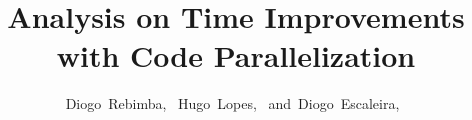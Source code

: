\documentclass[10pt,journal,compsoc]{IEEEtran}
\begin{document}
%
\title{Analysis on Time Improvements with Code Parallelization}
%
%
%
%

\author{Diogo~Rebimba,~
        Hugo~Lopes,~
        and~Diogo~Escaleira,~%
}
\end{document}
